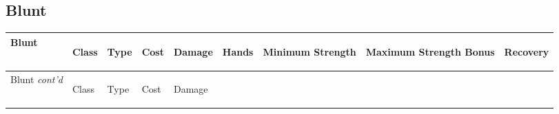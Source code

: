 \documentclass[twoside]{book}
\begin{document}
    

\subsection{Blunt}
    
\begin{longtable}{p{1.25in}llllp{2em}p{3em}p{3em}l} 
  Blunt
  &
  \begin{turn}{70}{Class}\end{turn}
          
  &
  \begin{turn}{70}{Type}\end{turn}
          
  &
  \begin{turn}{70}{Cost}\end{turn}
          
  &
  \begin{turn}{70}{Damage}\end{turn}
          
  &
  \begin{turn}{70}{Hands}\end{turn}
          
  &
  \begin{turn}{70}{Minimum Strength}\end{turn}
          
  &
  \begin{turn}{70}{Maximum Strength Bonus}\end{turn}
          
  &
  \begin{turn}{70}{Recovery}\end{turn}
          
  \\
  \hline
  \hline
  \endfirsthead
  Blunt \textit{cont'd}
        
  &
  \begin{turn}{70}{Class}\end{turn}
          
  &
  \begin{turn}{70}{Type}\end{turn}
          
  &
  \begin{turn}{70}{Cost}\end{turn}
          
  &
  \begin{turn}{70}{Damage}\end{turn}
          

\end{longtable}
\end{document}
